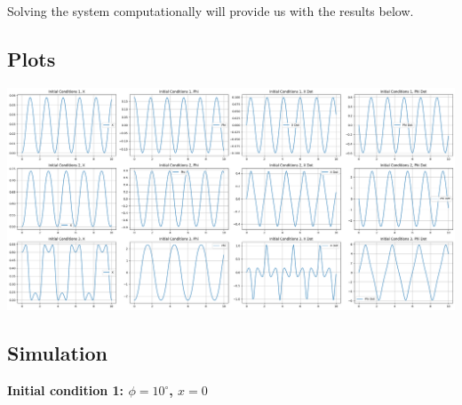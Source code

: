 \documentclass{article}
\begin{document}
Solving the system computationally will provide us with the results below.


\subsection{Plots}
\includegraphics[scale=0.25]{task2_plots.png}


\subsection{Simulation}


\textbf{Initial condition 1: $\phi = 10^\circ$, $x = 0$}
\end{document}
